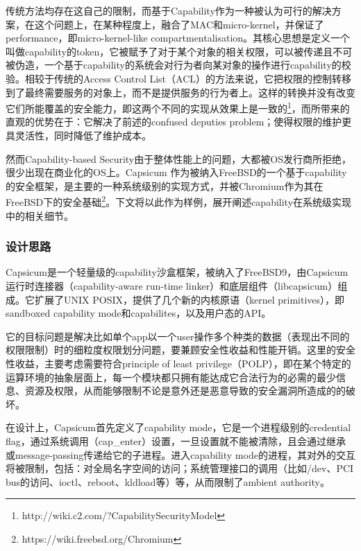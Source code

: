 \documentclass[final,5p,times]{elsarticle}
\begin{document}
传统方法均存在这自己的限制，而基于Capability作为一种被认为可行的解决方案，在这个问题上，在某种程度上，融合了MAC和micro-kernel，并保证了performance，即micro-kernel-like compartmentalisation。其核心思想是定义一个叫做capability的token，它被赋予了对于某个对象的相关权限，可以被传递且不可被伪造，一个基于capability的系统会对行为者向某对象的操作进行capability的校验。相较于传统的Access Control List（ACL）的方法来说，它把权限的控制转移到了最终需要服务的对象上，而不是提供服务的行为者上。这样的转换并没有改变它们所能覆盖的安全能力，即这两个不同的实现从效果上是一致的\footnote{http://wiki.c2.com/?CapabilitySecurityModel}，而所带来的直观的优势在于：它解决了前述的confused deputies problem；使得权限的维护更具灵活性，同时降低了维护成本。

然而Capability-based Security由于整体性能上的问题，大都被OS发行商所拒绝，很少出现在商业化的OS上。Capsicum \cite{capsicum} 作为被纳入FreeBSD的一个基于capability的安全框架，是主要的一种系统级别的实现方式，并被Chromium作为其在FreeBSD下的安全基础\footnote{https://wiki.freebsd.org/Chromium}。下文将以此作为样例，展开阐述capability在系统级实现中的相关细节。

\subsubsection{设计思路}
\label{sss:design}

Capsicum是一个轻量级的capability沙盒框架，被纳入了FreeBSD9，由Capsicum运行时连接器（capability-aware run-time linker）和底层组件（libcapsicum）组成。它扩展了UNIX POSIX，提供了几个新的内核原语（kernel primitives），即sandboxed capability mode和capabilites，以及用户态的API。

它的目标问题是解决比如单个app以一个user操作多个种类的数据（表现出不同的权限限制）时的细粒度权限划分问题，要兼顾安全性收益和性能开销。这里的安全性收益，主要考虑需要符合principle of least privilege（POLP），即在某个特定的运算环境的抽象层面上，每一个模块都只拥有能达成它合法行为的必需的最少信息、资源及权限，从而能够限制不论是意外还是恶意导致的安全漏洞所造成的的破坏。

在设计上，Capsicum首先定义了capability mode，它是一个进程级别的credential flag，通过系统调用（cap\_enter）设置，一旦设置就不能被清除，且会通过继承或message-passing传递给它的子进程。进入capability mode的进程，其对外的交互将被限制，包括：对全局名字空间的访问；系统管理接口的调用（比如/dev、PCI bus的访问、ioctl、reboot、kldload等）等，从而限制了ambient authority。
\end{document}
